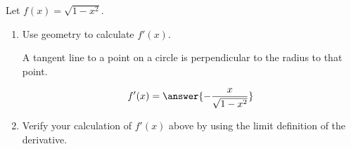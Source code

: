 \documentclass{ximera}
\author{Steven Gubkin}
\begin{document}
\begin{exercise}



Let $f(x) = \sqrt{1-x^2}$.  
\begin{enumerate}
\item Use geometry to calculate $f'(x)$.
\begin{hint}
A tangent line to a point on a circle is perpendicular to the radius to that point.
\end{hint}
\begin{prompt}
	\[f'(x) = \answer{ -\frac{x}{\sqrt{1-x^2}}} \]
\end{prompt}

\item Verify your calculation of $f'(x)$ above by using the limit definition of the derivative.

\end{enumerate}


\end{exercise}
\end{document}
